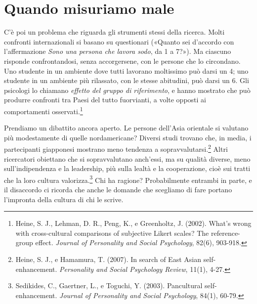 \section{Quando misuriamo male}

C'è poi un problema che riguarda gli strumenti stessi della ricerca. Molti confronti internazionali si basano su questionari («Quanto sei d'accordo con l'affermazione \textit{Sono una persona che lavora sodo}, da 1 a 7?»). Ma ciascuno risponde confrontandosi, senza accorgersene, con le persone che lo circondano. Uno studente in un ambiente dove tutti lavorano moltissimo può darsi un 4; uno studente in un ambiente più rilassato, con le stesse abitudini, può darsi un 6. Gli psicologi lo chiamano \textit{effetto del gruppo di riferimento}, e hanno mostrato che può produrre confronti tra Paesi del tutto fuorvianti, a volte opposti ai comportamenti osservati.\footnote{Heine, S. J., Lehman, D. R., Peng, K., e Greenholtz, J. (2002). What's wrong with cross-cultural comparisons of subjective Likert scales? The reference-group effect. \textit{Journal of Personality and Social Psychology}, 82(6), 903-918.}

Prendiamo un dibattito ancora aperto. Le persone dell'Asia orientale si valutano più modestamente di quelle nordamericane? Diversi studi trovano che, in media, i partecipanti giapponesi mostrano meno tendenza a sopravvalutarsi.\footnote{Heine, S. J., e Hamamura, T. (2007). In search of East Asian self-enhancement. \textit{Personality and Social Psychology Review}, 11(1), 4-27.} Altri ricercatori obiettano che si sopravvalutano anch'essi, ma su qualità diverse, meno sull'indipendenza e la leadership, più sulla lealtà e la cooperazione, cioè sui tratti che la loro cultura valorizza.\footnote{Sedikides, C., Gaertner, L., e Toguchi, Y. (2003). Pancultural self-enhancement. \textit{Journal of Personality and Social Psychology}, 84(1), 60-79.} Chi ha ragione? Probabilmente entrambi in parte, e il disaccordo ci ricorda che anche le domande che scegliamo di fare portano l'impronta della cultura di chi le scrive.

